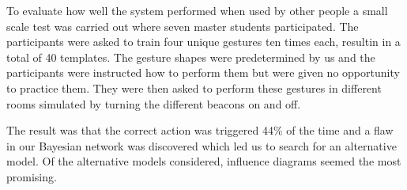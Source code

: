 To evaluate how well the system performed when used by other people a small scale test was carried out where seven master students participated.
The participants were asked to train four unique gestures ten times each, resultin in a total of 40 templates.
The gesture shapes were predetermined by us and the participants were instructed how to perform them but were given no opportunity to practice them.
They were then asked to perform these gestures in different rooms simulated by turning the different beacons on and off.

The result was that the correct action was triggered 44\% of the time and a flaw in our Bayesian network was discovered which led us to search for an alternative model.
Of the alternative models considered, influence diagrams seemed the most promising.